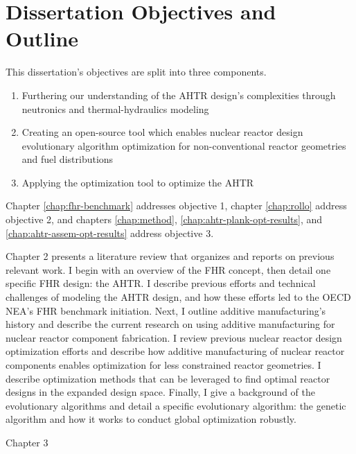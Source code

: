 \section{Dissertation Objectives and Outline}
This dissertation's objectives are split into three components. 
\begin{enumerate}
    \item Furthering our understanding of the \gls{AHTR} design's complexities 
    through neutronics and thermal-hydraulics modeling 
    \item Creating an open-source tool which enables nuclear reactor design 
    evolutionary algorithm optimization for non-conventional reactor geometries and fuel 
    distributions
    \item Applying the optimization tool to optimize the \gls{AHTR}
\end{enumerate}

Chapter \ref{chap:fhr-benchmark} addresses objective 1, chapter \ref{chap:rollo} 
address objective 2, and chapters \ref{chap:method}, \ref{chap:ahtr-plank-opt-results}, 
and \ref{chap:ahtr-assem-opt-results} address objective 3. 

Chapter 2 presents a literature review that organizes and reports on previous 
relevant work. 
I begin with an overview of the \gls{FHR} concept, then detail one specific 
\gls{FHR} design: the \gls{AHTR}. 
I describe previous efforts and technical challenges of modeling the \gls{AHTR} design, 
and how these efforts led to the \gls{OECD} \gls{NEA}'s \gls{FHR} benchmark initiation.
Next, I outline additive manufacturing's history and describe the current 
research on using additive manufacturing for nuclear reactor component fabrication. 
I review previous nuclear reactor design optimization efforts and describe how 
additive manufacturing of nuclear reactor components enables optimization for 
less constrained reactor geometries. 
I describe optimization methods that can be leveraged to find optimal reactor 
designs in the expanded design space.
Finally, I give a background of the evolutionary algorithms and detail a specific 
evolutionary algorithm: the genetic algorithm and how it works to conduct global 
optimization robustly.

Chapter 3 